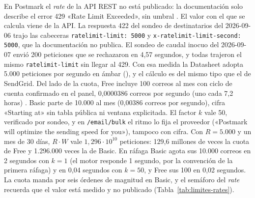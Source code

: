 En Postmark el \textit{rate} de la API REST no está publicado: la documentación solo describe el error 429 «Rate Limit Exceeded», sin umbral \citep{postmarkapi}.
El valor con el que se calcula viene de la API.
La respuesta 422 del sondeo de destinatarios del 2026-09-06 trajo las cabeceras \texttt{ratelimit-limit: 5000} y \texttt{x-ratelimit-limit-second: 5000}, que la documentación no publica.
El sondeo de caudal inocuo del 2026-09-07 envió 200 peticiones que se rechazaron en 4,57 segundos, y todas trajeron el mismo \texttt{ratelimit-limit} sin llegar al 429.
Con esa medida la Datasheet adopta 5.000 peticiones por segundo en ámbar (\semambar{}), y el cálculo es del mismo tipo que el de SendGrid.
Del lado de la cuota, Free incluye 100 correos al mes con ciclo de cuenta confirmado en el panel, 0,0000386 correos por segundo (uno cada 7,2 horas) \citep{postmarkpricing}.
Basic parte de 10.000 al mes (0,00386 correos por segundo), cifra «Starting at» sin tabla pública ni ventana explicitada.
El factor $k$ vale 50, verificado por sondeo, y en \texttt{/email/bulk} el ritmo lo fija el proveedor («Postmark will optimize the sending speed for you»), tampoco con cifra.
Con $R = 5.000$ y un mes de 30 días, $R \cdot W$ vale $1{,}296 \cdot 10^{10}$ peticiones: 129,6 millones de veces la cuota de Free y 1.296.000 veces la de Basic.
En ráfaga Basic agota sus 10.000 correos en 2 segundos con $k = 1$ (el motor responde 1 segundo, por la convención de la primera ráfaga) y en 0,04 segundos con $k = 50$, y Free sus 100 en 0,02 segundos.
La cuota manda por seis órdenes de magnitud en Basic, y el semáforo del \textit{rate} recuerda que el valor está medido y no publicado (Tabla~\ref{tab:limites-rates}).

